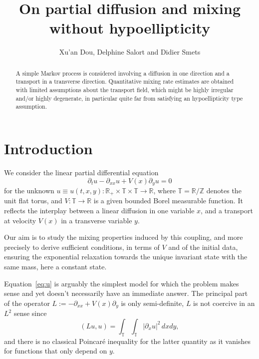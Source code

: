\documentclass[12pt]{article}
\title{On partial diffusion and mixing without hypoellipticity}
\author{Xu'an Dou, Delphine Salort and Didier Smets}
\date{}
\newcommand{\R}{\mathbb{R}}
\newcommand{\Z}{\mathbb{Z}}
\newcommand{\T}{\mathbb{T}}
\begin{document}
\maketitle

\begin{abstract}
A simple Markov process is considered involving a diffusion in one direction and
a transport in a transverse direction. Quantitative mixing rate estimates are 
obtained with limited assumptions about the transport field, which might be highly 
irregular and/or highly degenerate, in particular quite far from satisfying an 
hypoellipticity type assumption.
\end{abstract} 

\section{Introduction}
We consider the linear partial differential equation 
\begin{equation}\label{eq:u}
\partial_t u - \partial_{xx}u + V(x)\partial_y u = 0 
\end{equation}
for the unknown $ u \equiv u(t,x,y) : \R_+ \times \T \times \T \to \R $, where $
\T = \R/\Z $ denotes the unit flat torus, and $ V : \T \to \R $ is a given
bounded Borel measurable function.
It reflects the interplay between a linear diffusion in one variable $x$, 
and a transport at velocity $V(x)$ in a transverse variable $y$. 

Our aim is to study the mixing properties induced by 
this coupling, and more precisely to derive sufficient conditions, 
in terms of $V$ and of the initial data, ensuring the exponential 
relaxation towards the unique invariant state with the same mass, 
here a constant state.

Equation~\eqref{eq:u} is arguably the simplest model for which the
problem makes sense and yet doesn't necessarily have an immediate answer. The 
principal part of the operator $L := -\partial_{xx} + V(x)\partial_y$ 
is only semi-definite, $L$ is not coercive in an $L^2$ sense since  
\begin{equation*}\label{eq:nop}
	(Lu, u) =  \int_\T\int_\T |\partial_x u|^2 \,dx dy, 
\end{equation*}
and there is no classical Poincaré inequality for the latter quantity as it vanishes
for functions that only depend on $y$. 
\end{document}
